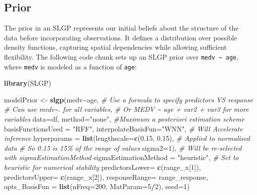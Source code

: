 \documentclass[
]{article}
\newenvironment{Shaded}{\begin{snugshade}}{\end{snugshade}}
\newcommand{\AttributeTok}[1]{\textcolor[rgb]{0.13,0.29,0.53}{#1}}
\newcommand{\CommentTok}[1]{\textcolor[rgb]{0.56,0.35,0.01}{\textit{#1}}}
\newcommand{\DecValTok}[1]{\textcolor[rgb]{0.00,0.00,0.81}{#1}}
\newcommand{\FloatTok}[1]{\textcolor[rgb]{0.00,0.00,0.81}{#1}}
\newcommand{\FunctionTok}[1]{\textcolor[rgb]{0.13,0.29,0.53}{\textbf{#1}}}
\newcommand{\NormalTok}[1]{#1}
\newcommand{\OtherTok}[1]{\textcolor[rgb]{0.56,0.35,0.01}{#1}}
\newcommand{\SpecialCharTok}[1]{\textcolor[rgb]{0.81,0.36,0.00}{\textbf{#1}}}
\newcommand{\StringTok}[1]{\textcolor[rgb]{0.31,0.60,0.02}{#1}}
\begin{document}
\subsection{Prior}\label{prior}

The prior in an SLGP represents our initial beliefs about the structure of the data before incorporating observations. It defines a distribution over possible density functions, capturing spatial dependencies while allowing sufficient flexibility.
The following code chunk sets up an SLGP prior over \texttt{medv\ \textasciitilde{}\ age}, where \texttt{medv} is modeled as a function of \texttt{age}:

\begin{Shaded}
\begin{Highlighting}[]
\FunctionTok{library}\NormalTok{(SLGP)}

\NormalTok{modelPrior }\OtherTok{\textless{}{-}} \FunctionTok{slgp}\NormalTok{(medv}\SpecialCharTok{\textasciitilde{}}\NormalTok{age, }\CommentTok{\# Use a formula to specify predictors VS response}
                   \CommentTok{\# Can use medv\textasciitilde{}. for all variables,}
                   \CommentTok{\# Or \textquotesingle{}MEDV\textquotesingle{} \textasciitilde{} age + var2 + var3 for more variables}
                   \AttributeTok{data=}\NormalTok{df,}
                   \AttributeTok{method=}\StringTok{"none"}\NormalTok{, }\CommentTok{\#Maximum a posteriori estimation scheme}
                   \AttributeTok{basisFunctionsUsed =} \StringTok{"RFF"}\NormalTok{,}
                   \AttributeTok{interpolateBasisFun=}\StringTok{"WNN"}\NormalTok{, }\CommentTok{\# Will Accelerate inference}
                   \AttributeTok{hyperparams =} \FunctionTok{list}\NormalTok{(}\AttributeTok{lengthscale=}\FunctionTok{c}\NormalTok{(}\FloatTok{0.15}\NormalTok{, }\FloatTok{0.15}\NormalTok{), }
                                      \CommentTok{\# Applied to normalised data}
                                      \CommentTok{\# So 0.15 is 15\% of the range of values}
                                      \AttributeTok{sigma2=}\DecValTok{1}\NormalTok{), }
                   \CommentTok{\# Will be re{-}selected with sigmaEstimationMethod}
                   \AttributeTok{sigmaEstimationMethod =} \StringTok{"heuristic"}\NormalTok{, }
                   \CommentTok{\# Set to heuristic for numerical stability                 }
                   \AttributeTok{predictorsLower=} \FunctionTok{c}\NormalTok{(range\_x[}\DecValTok{1}\NormalTok{]),}
                   \AttributeTok{predictorsUpper=} \FunctionTok{c}\NormalTok{(range\_x[}\DecValTok{2}\NormalTok{]),}
                   \AttributeTok{responseRange=}\NormalTok{ range\_response,}
                   \AttributeTok{opts\_BasisFun =} \FunctionTok{list}\NormalTok{(}\AttributeTok{nFreq=}\DecValTok{200}\NormalTok{,}
                                        \AttributeTok{MatParam=}\DecValTok{5}\SpecialCharTok{/}\DecValTok{2}\NormalTok{),}
                   \AttributeTok{seed=}\DecValTok{1}\NormalTok{)}
\end{Highlighting}
\end{Shaded}
\end{document}
